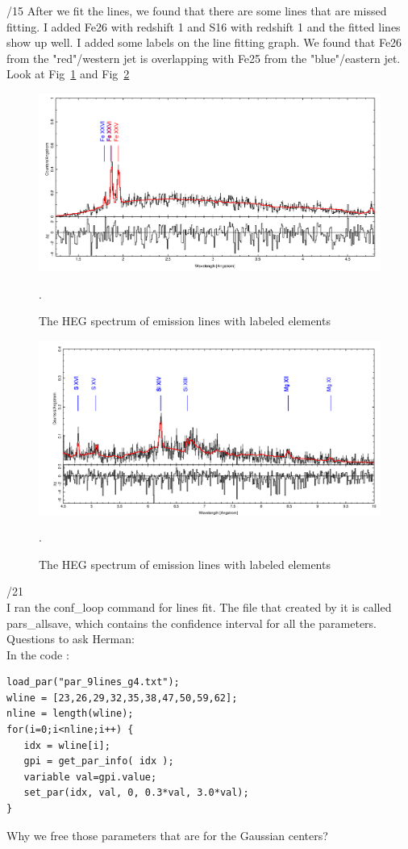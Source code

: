 /15
After we fit the lines, we found that there are some lines that are missed fitting. I added Fe26 with redshift 1 and S16 with redshift 1 and the fitted lines show up well. I added some labels on the line fitting graph. We found that Fe26 from the "red"/western jet is overlapping with Fe25 from the "blue"/eastern jet. Look at Fig~\ref{fig:labeled1} and Fig~\ref{fig:labeled2}
\begin{figure}[h!]
    \centering
    \includegraphics[width=0.9\linewidth]{Chapters/Figures/label1.png}
    \caption{The HEG spectrum of emission lines with labeled elements}.
    \label{fig:labeled1}
\end{figure}

\begin{figure}[h!]
    \centering
    \includegraphics[width=0.9\linewidth]{Chapters/Figures/label2.png}
    \caption{The HEG spectrum of emission lines with labeled elements}.
    \label{fig:labeled2}
\end{figure}

/21\\
I ran the conf\_loop command for lines fit. The file that created by it is called pars\_allsave, which contains the confidence interval for all the parameters.\\
Questions to ask Herman:\\
In the code :
\begin{lstlisting}
load_par("par_9lines_g4.txt");
wline = [23,26,29,32,35,38,47,50,59,62];
nline = length(wline);
for(i=0;i<nline;i++) {
   idx = wline[i];
   gpi = get_par_info( idx );
   variable val=gpi.value;
   set_par(idx, val, 0, 0.3*val, 3.0*val);
}
\end{lstlisting}
Why we free those parameters that are for the Gaussian centers?

